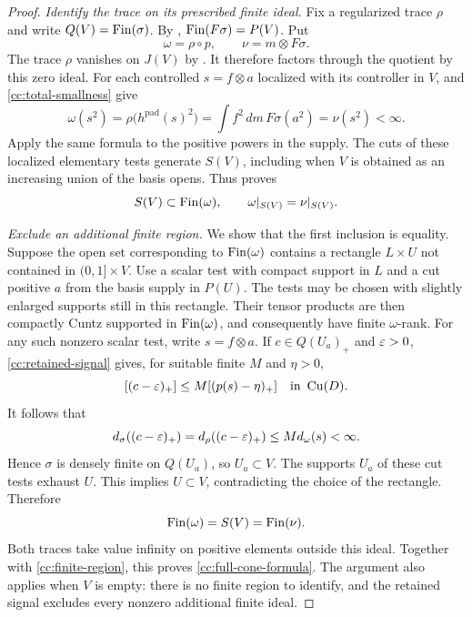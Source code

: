 \begin{proof}
\smallskip\noindent\emph{Identify the trace on its prescribed finite ideal.} 
Fix a regularized trace $\rho$ and write
$Q(V)=\operatorname{Fin}(\sigma)$.  By ,
$\operatorname{Fin}(F\sigma)=P(V)$.  Put
\[
 \omega=\rho\circ p,\qquad \nu=m\otimes F\sigma.
\]
The trace $\rho$ vanishes on $J(V)$ by
.  It therefore factors
through the quotient by this zero ideal.  For each controlled
$s=f\otimes a$ localized with its controller in $V$,
 and \eqref{cc:total-smallness} give
\begin{equation}\label{cc:square-agreement}
 \omega(s^2)
 =\rho\bigl(h^{\mathrm{pad}}(s)^2\bigr)
 =\int f^2\,dm\, F\sigma(a^2)
 =\nu(s^2)<\infty.
\end{equation}
Apply the same formula to the positive powers in the supply.
The cuts of these localized elementary tests generate
$S(V)$, including when $V$ is obtained as an increasing union
of the basis opens.  Thus 
proves
\begin{equation}\label{cc:finite-region}
 S(V)\subset\operatorname{Fin}(\omega),\qquad
 \omega|_{S(V)}=\nu|_{S(V)}.
\end{equation}

\smallskip\noindent\emph{Exclude an additional finite region.} 
We show that the first inclusion is equality.  Suppose the
open set corresponding to $\operatorname{Fin}(\omega)$ contains a
rectangle $L\times U$ not contained in $(0,1]\times V$.
Use a scalar test with compact support in $L$ and a cut
positive $a$ from the basis supply in $P(U)$.  The tests may
be chosen with slightly enlarged supports still in this
rectangle.  Their tensor products are then compactly Cuntz
supported in $\operatorname{Fin}(\omega)$, and consequently have finite
$\omega$-rank.  For any such nonzero scalar test, write
$s=f\otimes a$.  If $c\in Q(U_a)_+$ and $\varepsilon>0$,
\eqref{cc:retained-signal} gives, for suitable finite $M$
and $\eta>0$,
\begin{equation}\label{cc:constant-finiteness}
 [(c-\varepsilon)_+]\le M[(p(s)-\eta)_+]
 \quad\hbox{in }\operatorname{Cu}(D).
\end{equation}
It follows that
\[
 d_\sigma((c-\varepsilon)_+)
 =d_\rho((c-\varepsilon)_+)
 \le M d_\omega(s)<\infty.
\]
Hence $\sigma$ is densely finite on $Q(U_a)$, so
$U_a\subset V$.  The supports $U_a$ of these cut tests
exhaust $U$.  This implies $U\subset V$, contradicting the
choice of the rectangle.  Therefore
\begin{equation}\label{cc:exact-finite-ideal}
 \operatorname{Fin}(\omega)=S(V)=\operatorname{Fin}(\nu).
\end{equation}
Both traces take value infinity on positive elements outside
this ideal.  Together with \eqref{cc:finite-region}, this
proves \eqref{cc:full-cone-formula}.  The argument also
applies when $V$ is empty: there is no finite region to
identify, and the retained signal excludes every nonzero
additional finite ideal.
\end{proof}
